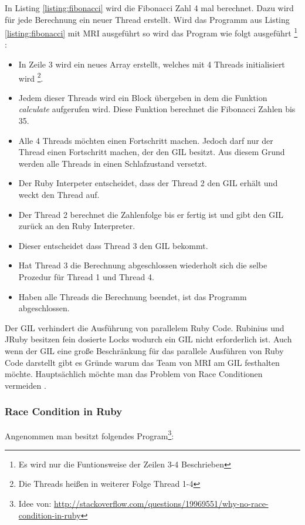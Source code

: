 In Listing \ref{listing:fibonacci} wird die Fibonacci Zahl 4 mal berechnet. Dazu wird für jede Berechnung ein neuer Thread erstellt. Wird das Programm aus Listing \ref{listing:fibonacci} mit MRI ausgeführt so wird das Program wie folgt ausgeführt \footnote{Es wird nur die Funtionsweise der Zeilen 3-4 Beschrieben} \cite[p. 45-46]{Sto2013}: 

\begin{itemize}
  \item In Zeile 3 wird ein neues Array erstellt, welches mit 4 Threads initialisiert wird \footnote{Die Threads heißen in weiterer Folge Thread 1-4}.
  \item Jedem dieser Threads wird ein Block übergeben in dem die Funktion \emph{calculate} aufgerufen wird. Diese Funktion berechnet die Fibonacci Zahlen bis 35.
  \item Alle 4 Threads möchten einen Fortschritt machen. Jedoch darf nur der Thread einen Fortschritt machen, der den GIL besitzt. Aus diesem Grund werden alle Threads in einen Schlafzustand versetzt.
  \item Der Ruby Interpeter entscheidet, dass der Thread 2 den GIL erhält und weckt den Thread auf.
  \item Der Thread 2 berechnet die Zahlenfolge bis er fertig ist und gibt den GIL zurück an den Ruby Interpreter.
  \item Dieser entscheidet dass Thread 3 den GIL bekommt.
  \item Hat Thread 3 die Berechnung abgeschlossen wiederholt sich die selbe Prozedur für Thread 1 und Thread 4.
  \item Haben alle Threads die Berechnung beendet, ist das Programm abgeschlossen.
\end{itemize}

Der GIL verhindert die Ausführung von parallelem Ruby Code. Rubinius und JRuby besitzen fein dosierte Locks wodurch ein GIL nicht erforderlich ist. Auch wenn der GIL eine große Beschränkung für das parallele Ausführen von Ruby Code darstellt gibt es Gründe warum das Team von MRI am GIL festhalten möchte. Hauptsächlich möchte man das Problem von Race Conditionen vermeiden \cite[p. 48-49]{Sto2013}.

\subsubsection{Race Condition in Ruby}

Angenommen man besitzt folgendes Program\footnote{Idee von: \url{http://stackoverflow.com/questions/19969551/why-no-race-condition-in-ruby}}: 

